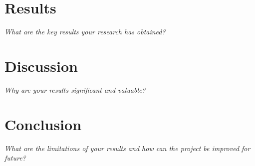 \documentclass[11pt]{article}
\begin{document}
\section{Results}
\emph{What are the key results your research has obtained?}

\section{Discussion}
\emph{Why are your results significant and valuable?}

\section{Conclusion}
\emph{What are the limitations of your results and how can the project be improved for future?}

\newpage


\end{document}
